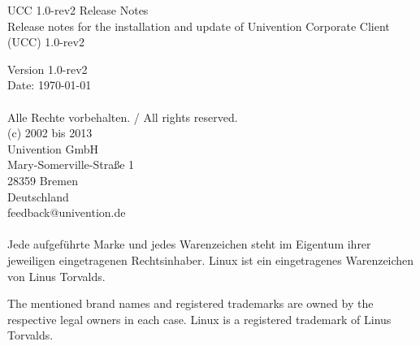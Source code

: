 


\newcommand{\ucsManualTitle}{UCC 1.0-rev2 Release Notes}
\newcommand{\ucsManualSubtitle}{Release notes for the installation and update of Univention Corporate Client (UCC) 1.0-rev2}
\newcommand{\ucsManualVersion}{1.0-rev2}
\newcommand{\ucsTechAuthor}{ & Univention GmbH & feedback@univention.de}

\setcounter{secnumdepth}{3}
\setcounter{tocdepth}{3}


\begin{titlepage}
  \thispagestyle{empty}

  \vspace*{3cm}
  \sffamily \bfseries
  \begin{center}
    \Huge
      \ucsManualTitle \\ [3.5cm]
    \huge
      \ucsManualSubtitle
  \end{center}
  \normalsize
  \normalfont

\newpage
\AddToShipoutPicture{\ifthenelse{\isodd{\thepage}}%
        {\BackgroundPicOdd}{\BackgroundPicEven}}
\thispagestyle{empty}
\parindent0cm
\sffamily
\vspace*{12cm}

Version \ucsManualVersion \\
Date: \today \\
\\
Alle Rechte vorbehalten. / All rights reserved.\\
(c) 2002 bis 2013 \\
Univention GmbH \\
Mary-Somerville-Straße 1 \\
28359 Bremen \\
Deutschland \\
feedback@univention.de \\
\\
Jede aufgeführte Marke und jedes Warenzeichen steht im Eigentum ihrer
jeweiligen eingetragenen Rechtsinhaber. Linux ist ein eingetragenes
Warenzeichen von Linus Torvalds.

The mentioned brand names and registered trademarks are owned by the
respective legal owners in each case. Linux is a registered trademark
of Linus Torvalds.

\end{titlepage}


